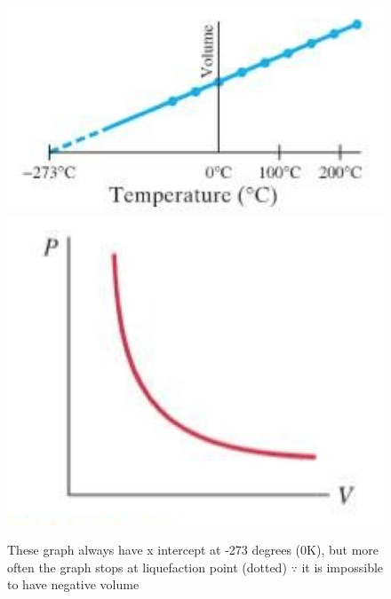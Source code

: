 \documentclass[12 pt , twoside, letterpaper] {article}
\begin{document}
\begin{figure}[H]
\includegraphics[scale=0.5]{VTgraph}
\includegraphics[scale=0.5]{PVgraph}
\caption{These graph always have x intercept at -273 degrees (0K), but more often the graph stops at liquefaction point (dotted) $\because$ it is impossible to have negative volume}
\end{figure}
\vspace{-20pt}
\end{document}
